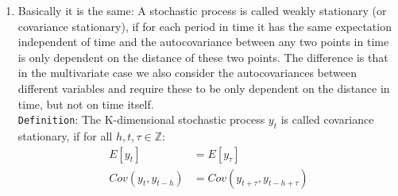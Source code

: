 \begin{enumerate}
\item Basically it is the same:
A stochastic process is called weakly stationary (or covariance stationary),
  if for each period in time it has the same expectation independent of time
  and the autocovariance between any two points in time is only dependent on the distance of these two points.
The difference is that in the multivariate case we also consider the autocovariances between different variables
  and require these to be only dependent on the distance in time, but not on time itself.
\\
\texttt{Definition}: The K-dimensional stochastic process \(y_t\) is called covariance stationary, if for all \(h,t,\tau \in \mathbb{Z}\):
\begin{align}
E[{y_t}] &= E[{y_\tau}]
\\
Cov(y_{t},y_{t-h}) &= Cov(y_{t+\tau}, y_{t-h+\tau}) \label{gammas}
\end{align}


\end{enumerate}
